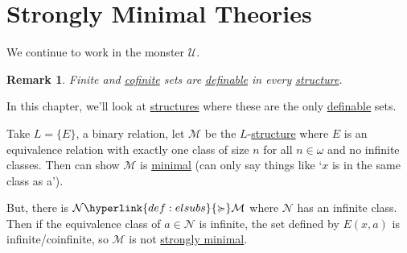\documentclass{article}
\newtheorem{nremark}[nthm]{Remark}
\newcommand{\named}[1]{\textbf{#1}\index{#1}}
\newcommand{\M}{\mathcal{M}}
\begin{document}
\section{Strongly Minimal Theories}
We continue to work in the monster $\mathcal{U}$.
\begin{nremark}
  Finite and \hyperlink{def:cofinite}{cofinite} sets are \hyperlink{def:def}{definable} in every \hyperlink{def:str}{structure}.
\end{nremark}
In this chapter, we'll look at \hyperlink{def:str}{structures} where these are the only \hyperlink{def:def}{definable} sets.
\begin{eg}
  Take $L = \{E\}$, a binary relation, let $\mathcal{M}$ be the $L$-\hyperlink{def:str}{structure} where $E$ is an equivalence relation with exactly one class of size $n$ for all $n \in \omega$ and no infinite classes.
  Then can show $\mathcal{M}$ is \hyperlink{def:minimal}{minimal} (can only say things like `$x$ is in the same class as a').

  But, there is $\mathcal{N} \hyperlink{def:elsubs}{\succcurlyeq} \mathcal{M}$ where $\mathcal{N}$ has an infinite class.
  Then if the equivalence class of $a \in \mathcal{N}$ is infinite, the set defined by $E(x,a)$ is infinite/coinfinite, so $\M$ is not \hyperlink{def:minimal}{strongly minimal}.
\end{eg}
\end{document}
